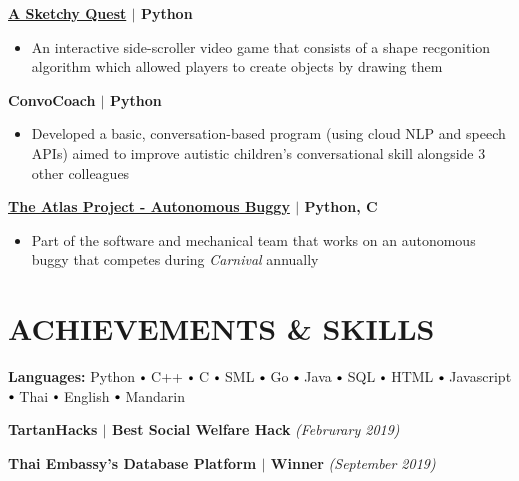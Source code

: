 \documentclass[10pt]{article}
\newcommand\sbullet[1][.5]{\mathbin{\vcenter{\hbox{\scalebox{#1}{$\bullet$}}}}}
\newcommand{\CC}{C\nolinebreak\hspace{-.05em}\raisebox{.4ex}{\tiny\bf +}\nolinebreak\hspace{-.10em}\raisebox{.4ex}{\tiny\bf +}}
\begin{document}
  \textbf{\large \href{https://github.com/Piratach/A-Sketchy-Quest}{A Sketchy Quest} $\mid$ Python} 
  \vspace*{-0.17cm}
  \begin{itemize}
    \itemsep-0.4em
    \item \textcolor{lighterG}{An interactive side-scroller video game that consists of a shape recgonition algorithm which allowed players to create objects by drawing them}
  \end{itemize}

  \textbf{\large ConvoCoach $\mid$ Python} 
  \vspace*{-0.17cm}
  \begin{itemize}
    \itemsep-0.4em
    \item \textcolor{lighterG}{Developed a basic, conversation-based program (using cloud NLP and speech APIs) aimed to improve autistic children's conversational skill alongside 3 other colleagues}
  \end{itemize}

  \textbf{\large \href{https://sites.google.com/view/atlasbuggy/}{The Atlas Project - Autonomous Buggy} $\mid$ Python, \CC} 
  \vspace*{-0.17cm}
  \begin{itemize}
    \itemsep0em
    \item \textcolor{lighterG}{Part of the software and mechanical team that works on an autonomous buggy that competes during \textit{Carnival} annually}
  \end{itemize}


  \section*{\large \textcolor{lighterB}{ACHIEVEMENTS \& SKILLS}}
  \vspace*{-0.3cm}

    \textbf{Languages:}
    Python $\sbullet[.75]$ 
    C++ $\sbullet[.75]$
    C $\sbullet[.75]$ 
    SML $\sbullet[.75]$ 
    Go $\sbullet[.75]$ 
    Java $\sbullet[.75]$
    SQL $\sbullet[.75]$ 
    HTML $\sbullet[.75]$ 
    Javascript $\sbullet[.75]$
    Thai $\sbullet[.75]$ 
    English $\sbullet[.75]$ 
    Mandarin

    \vspace{0.1cm}

    \textbf{TartanHacks $\mid$ Best Social Welfare Hack} \hfill \textit{(Februrary 2019)}

    \textbf{Thai Embassy's Database Platform $\mid$ Winner} \hfill \textit{(September 2019)}
\end{document}
